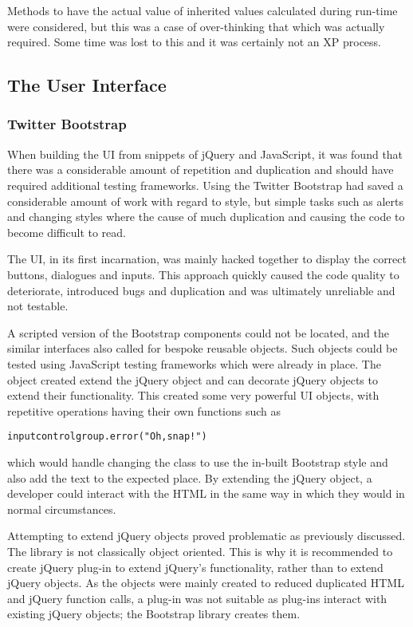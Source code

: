 Methods to have the actual value of inherited values calculated during run-time were considered, but this was a case of over-thinking that which was actually required. Some time was lost to this and it was certainly not an XP process.

\subsection{The User Interface}
\subsubsection{Twitter Bootstrap}
When building the UI from snippets of jQuery and Java\-Script, it was found that there was a considerable amount of repetition and duplication and should have required additional testing frameworks. Using the Twitter Bootstrap had saved a considerable amount of work with regard to style, but simple tasks such as alerts and changing styles where the cause of much duplication and causing the code to become difficult to read.

The UI, in its first incarnation, was mainly hacked together to display the correct buttons, dialogues and inputs. This approach quickly caused the code quality to deteriorate, introduced bugs and duplication and was ultimately unreliable and not testable.

A scripted version of the Bootstrap components could not be located, and the similar interfaces also called for bespoke reusable objects. Such objects could be tested using Java\-Script testing frameworks which were already in place. The object created extend the jQuery object and can decorate jQuery objects to extend their functionality. This created some very powerful UI objects, with repetitive operations having their own functions such as
\begin{alltt}inputcontrolgroup.error("Oh, snap!")\end{alltt}
which would handle changing the class to use the in-built Bootstrap style and also add the text to the expected place. By extending the jQuery object, a developer could interact with the HTML in the same way in which they would in normal circumstances.

Attempting to extend jQuery objects proved problematic as previously discussed. The library is not classically object oriented. This is why it is recommended to create jQuery plug-in to extend jQuery's functionality, rather than to extend jQuery objects. As the objects were mainly created to reduced duplicated HTML and jQuery function calls, a plug-in was not suitable as plug-ins interact with existing jQuery objects; the Bootstrap library creates them.

